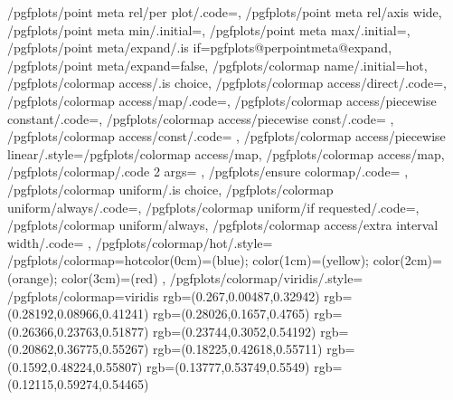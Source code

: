 {	/pgfplots/point meta rel/per plot/.code={\def\pgfplots@perpointmeta@rel@choice{1}},%
	/pgfplots/point meta rel/axis wide,%
	/pgfplots/point meta min/.initial=,%
	/pgfplots/point meta max/.initial=,%
	/pgfplots/point meta/expand/.is if=pgfplots@perpointmeta@expand,
	/pgfplots/point meta/expand=false,
	/pgfplots/colormap name/.initial=hot,
	/pgfplots/colormap access/.is choice,
	/pgfplots/colormap access/direct/.code={\def\pgfplots@colormap@access{d}},%
	/pgfplots/colormap access/map/.code={\def\pgfplots@colormap@access{m}},%
	/pgfplots/colormap access/piecewise constant/.code={\def\pgfplots@colormap@access{c}},%
	/pgfplots/colormap access/piecewise const/.code=   {\def\pgfplots@colormap@access{c}},%
	/pgfplots/colormap access/const/.code=             {\def\pgfplots@colormap@access{c}},%
	/pgfplots/colormap access/piecewise linear/.style={/pgfplots/colormap access/map},
	/pgfplots/colormap access/map,%
	/pgfplots/colormap/.code 2 args={%
	},
	/pgfplots/ensure colormap/.code={%
		\pgfplots@ensure@old@cm
		\pgfplots@ensure@old@cm
	},
	/pgfplots/colormap uniform/.is choice,
	/pgfplots/colormap uniform/always/.code={\def\pgfplots@colormap@uniform@choice{0}},
	/pgfplots/colormap uniform/if requested/.code={\def\pgfplots@colormap@uniform@choice{1}},
	/pgfplots/colormap uniform/always,
	/pgfplots/colormap access/extra interval width/.code={%
	},
	/pgfplots/colormap/hot/.style={
		/pgfplots/colormap={hot}{color(0cm)=(blue); color(1cm)=(yellow); color(2cm)=(orange); color(3cm)=(red)}
	},
	/pgfplots/colormap/viridis/.style={%
		/pgfplots/colormap={viridis}{%
			rgb=(0.267,0.00487,0.32942)
			rgb=(0.28192,0.08966,0.41241)
			rgb=(0.28026,0.1657,0.4765)
			rgb=(0.26366,0.23763,0.51877)
			rgb=(0.23744,0.3052,0.54192)
			rgb=(0.20862,0.36775,0.55267)
			rgb=(0.18225,0.42618,0.55711)
			rgb=(0.1592,0.48224,0.55807)
			rgb=(0.13777,0.53749,0.5549)
			rgb=(0.12115,0.59274,0.54465)
}}}
